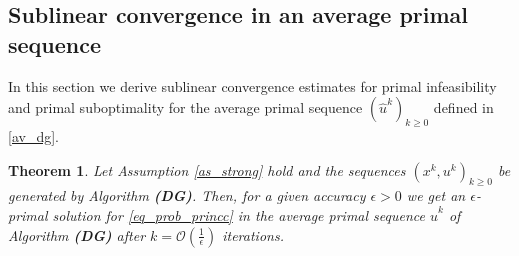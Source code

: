 \documentclass{gOMS2e}
\theoremstyle{plain}
\newtheorem{theorem}{Theorem}[section]
\theoremstyle{definition}
\theoremstyle{remark}
\begin{document}
\subsection{Sublinear convergence in an average  primal sequence}
\label{sublinear_av} \noindent In this section we derive sublinear
convergence  estimates for  primal infeasibility  and primal
suboptimality for the average primal sequence $({\hat u}^k)_{k \geq
0}$ defined  in \eqref{av_dg}.

\begin{theorem}
\label{th_dgav} Let Assumption \ref{as_strong} hold and the
sequences $\left(x^k,u^k\right)_{k\geq 0}$ be generated by Algorithm
{\bf (DG)}. Then, for a given accuracy $\epsilon>0$ we get an
$\epsilon$-primal solution for \eqref{eq_prob_princc} in the average
primal sequence  $\hat u^k$ of Algorithm \textbf{(DG)} after $k =
{\mathcal O} (\frac{1}{\epsilon})$ iterations.
\end{theorem}
\end{document}
